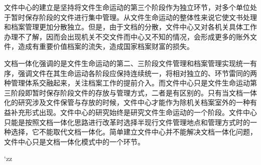     文件中心的建立是坚持将文件生命运动的第三个阶段作为独立环节，对多个单位处于暂时保存阶段的文件进行集中管理。从文件生命运动的整体性来说它使文书处理和档案管理更加分散独立。但是，由于文档的分散，文件中心又对各机关具体工作办理不了解，因而会出现机关不交文件而中心又不知的情况，会形成更多的账外文件，造成有重要价值档案的流失，造成国家档案财富的损失。

    文档一体化强调的是文件生命运动的第二、三阶段文件管理和档案管理实现统一有序，强调文件在其生命运动各阶段应保持连续统一，将相对独立的、环节雷同的两种管理体系交融起来，关注档案工作的提前介入。而文件中心只是文件生命运动第三阶段即暂时保存阶段文件的存放与管理方式，二者是有区别的。只有当文档一体化的研究涉及文件保管与存放的时候，文件中心才能作为除机关档案室外的一种有益补充形式出现。文件中心的研究始终是研究文件生命运动的一个阶段。文件中心只能是按照文档一体化思路进行改革时选择半现行文件管理地点和管理方式时的一种选择，它不能取代文档一体化。简单建立文件中心并不能解决文档一体化问题，文件中心只是文档一体化模式中的一个环节。

    `zz
